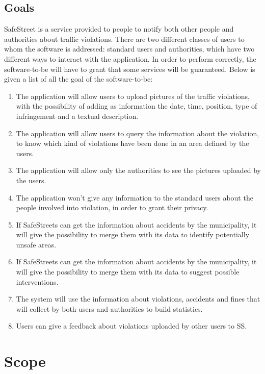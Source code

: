 \documentclass[a4paper, hidelinks, 12pt]{report}
\newcommand\goal[1]{\item[{[G#1]}] }
\begin{document}
        \subsection{Goals}\label{subsec:goals}
            SafeStreet is a service provided to people to notify both other people and authorities about traffic violations. There are two different classes of users to whom the software is addressed: standard users and authorities, which have two different ways to interact with the application.
            In order to perform correctly, the software-to-be will have to grant that some services will be guaranteed. Below is given a list of all the goal of the software-to-be:
            \begin{enumerate}
                \goal{1} The application will allow users to upload pictures of the traffic violations, with the possibility of adding as information the date, time, position, type of infringement and a textual description.
                \goal{2} The application will allow users to query the information about the violation, to know which kind of violations have been done in an area defined by the users.
                \goal{3} The application will allow only the authorities to see the pictures uploaded by the users.
                \goal{4} The application won’t give any information to the standard users about the people involved into violation, in order to grant their privacy.
                \goal{5} If SafeStreets can get the information about accidents by the municipality, it will give the possibility to merge them with its data to identify potentially unsafe areas.
                \goal{6} If SafeStreets can get the information about accidents by the municipality, it will give the possibility to merge them with its data to suggest possible interventions.
                \goal{7} The system will use the information about violations, accidents and fines that will collect by both users and authorities to build statistics.
                \goal{8} Users can give a feedback about violations uploaded by other users to SS.
            \end{enumerate}
	\section{Scope}\label{sec:scope}
\end{document}
